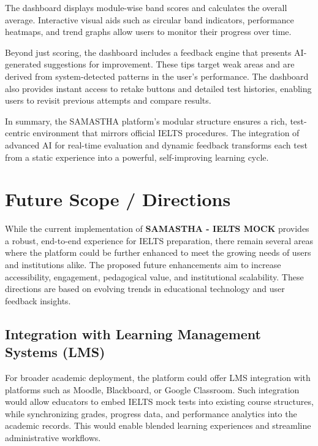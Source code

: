 \documentclass[a4paper,12pt]{article}
\begin{document}
The dashboard displays module-wise band scores and calculates the overall average. Interactive visual aids such as circular band indicators, performance heatmaps, and trend graphs allow users to monitor their progress over time.

Beyond just scoring, the dashboard includes a feedback engine that presents AI-generated suggestions for improvement. These tips target weak areas and are derived from system-detected patterns in the user’s performance. The dashboard also provides instant access to retake buttons and detailed test histories, enabling users to revisit previous attempts and compare results.

\vspace{0.5cm}

\noindent
In summary, the SAMASTHA platform's modular structure ensures a rich, test-centric environment that mirrors official IELTS procedures. The integration of advanced AI for real-time evaluation and dynamic feedback transforms each test from a static experience into a powerful, self-improving learning cycle.



\newpage
\section{Future Scope / Directions}

\vspace{0.5cm}

While the current implementation of \textbf{SAMASTHA - IELTS MOCK} provides a robust, end-to-end experience for IELTS preparation, there remain several areas where the platform could be further enhanced to meet the growing needs of users and institutions alike. The proposed future enhancements aim to increase accessibility, engagement, pedagogical value, and institutional scalability. These directions are based on evolving trends in educational technology and user feedback insights.

\vspace{0.5cm}

\subsection{Integration with Learning Management Systems (LMS)}

For broader academic deployment, the platform could offer LMS integration with platforms such as Moodle, Blackboard, or Google Classroom. Such integration would allow educators to embed IELTS mock tests into existing course structures, while synchronizing grades, progress data, and performance analytics into the academic records. This would enable blended learning experiences and streamline administrative workflows.
\end{document}
